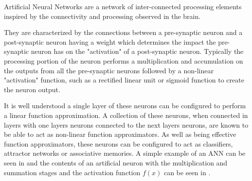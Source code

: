 Artificial Neural Networks are a network of inter-connected processing elements inspired by the 
connectivity and processing observed in the brain.

They are characterized by the connections between a pre-synaptic neuron and a post-synaptic
neuron having a weight which determines the impact the pre-synaptic neuron has on the 
"activation" of a post-synaptic neuron.
Typically the processing portion of the neuron performs a multiplication and accumulation on the outputs from all
the pre-synaptic neurons followed by a non-linear "activation" function, such as a rectified linear unit or sigmoid function to create the neuron output.

It is well understood a single layer of these neurons can be configured to perform a linear function approximation.
A collection of these neurons, when connected in layers with one layers neurons connected to
the next layers neurons, are known to be able to act as non-linear function approximators.
As well as being effective function approximators, these neurons can be configured to act as 
classifiers, attractor networks or associative memories.
A simple example of an ANN can be seen in  and the contents of an artificial neuron 
with the multiplication and summation stages and the activation function $f(x)$ can be seen in . 


